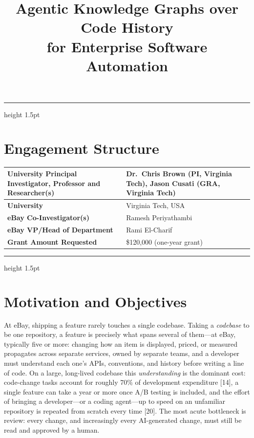 \documentclass[11pt, letterpaper]{article}
\title{Agentic Knowledge Graphs over Code History\\for Enterprise Software Automation}
\author{}
\date{}
\makeatletter
\renewcommand{\maketitle}{%
  {\parindent0pt\relax
   \fontsize{36}{43}\selectfont\color{ebay-dark}\bfseries\raggedright
   \@title\par}%
  {\color{gray!60}\hrule height 1.5pt\par}%
}
\newcommand{\ehr}{{\color{gray!60}\hrule height 1.5pt}}
\makeatother
\begin{document}
\maketitle

\section*{Engagement Structure}
\label{sec:engagement}

\noindent
\begin{tabularx}{\textwidth}{>{\raggedright\arraybackslash}p{} X}
  \toprule
  \textbf{University Principal Investigator, Professor and Researcher(s)} &
  Dr.~Chris Brown (PI, Virginia Tech), Jason Cusati (GRA, Virginia Tech) \\
  \midrule
  \textbf{University} & Virginia Tech, USA \\
  \midrule
  \textbf{eBay Co-Investigator(s)} & Ramesh Periyathambi \\
  \midrule
  \textbf{eBay VP/Head of Department} & Rami El-Charif \\
  \midrule
  \textbf{Grant Amount Requested} & \$120,000 (one-year grant) \\
  \bottomrule
\end{tabularx}

\ehr

\section*{Motivation and Objectives}
\label{sec:objectives}

At eBay, shipping a feature rarely touches a single codebase. Taking a \emph{codebase} to be one repository, a feature is precisely what spans several of them---at eBay, typically five or more: changing how an item is displayed, priced, or measured propagates across separate services, owned by separate teams, and a developer must understand each one's APIs, conventions, and history before writing a line of code. On a large, long-lived codebase this \emph{understanding} is the dominant cost: code-change tasks account for roughly 70\% of development expenditure [14], a single feature can take a year or more once A/B testing is included, and the effort of bringing a developer---or a coding agent---up to speed on an unfamiliar repository is repeated from scratch every time [20]. The most acute bottleneck is review: every change, and increasingly every AI-generated change, must still be read and approved by a human.
\end{document}
